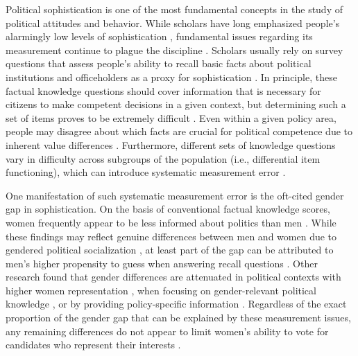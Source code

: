 

Political sophistication is one of the most fundamental concepts in the study of political attitudes and behavior. While scholars have long emphasized people's alarmingly low levels of sophistication \citep{converse1964nature,carpini1996americans}, fundamental issues regarding its measurement continue to plague the discipline \citep{mondak2001developing,bullock2021response}. Scholars usually rely on survey questions that assess people's ability to recall basic facts about political institutions and officeholders as a proxy for sophistication \citep{carpini1993measuring,barabas2014question}. In principle, these factual knowledge questions should cover information that is necessary for citizens to make competent decisions in a given context, but determining such a set of items proves to be extremely difficult \citep{lupia2006elitism}. Even within a given policy area, people may disagree about which facts are crucial for political competence due to inherent value differences \citep{lupia2015uninformed}. Furthermore, different sets of knowledge questions vary in difficulty across subgroups of the population (i.e., differential item functioning), which can introduce systematic measurement error \citep{pietryka2013analysis}.

One manifestation of such systematic measurement error is the oft-cited gender gap in sophistication. On the basis of conventional factual knowledge scores, women frequently appear to be less informed about politics than men \citep{verba1997knowing,wolak2011roots,fraile2014women}. While these findings may reflect genuine differences between men and women due to gendered political socialization \citep{bos2021one}, at least part of the gap can be attributed to men's higher propensity to guess when answering recall questions \citep{mondak2004knowledge,fortin2020political}. Other research found that gender differences are attenuated in political contexts with higher women representation \citep{pereira2019gendered}, when focusing on gender-relevant political knowledge \citep{dolan2011women}, or by providing policy-specific information \citep{jerit2017revisiting}. Regardless of the exact proportion of the gender gap that can be explained by these measurement issues, any remaining differences do not appear to limit women's ability to vote for candidates who represent their interests \citep{dassonneville2020women}.

